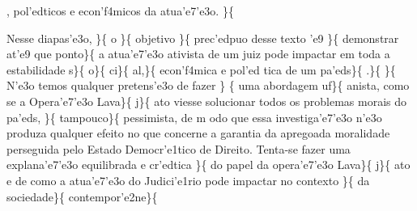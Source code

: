  \ltrch{}
 ,
pol'edticos e econ'f4micos da atua'e7'e3o. \}\{\rtlch{} 
\ltrch{}  \par Nesse diapas'e3o,
\}\{\rtlch{}  \ltrch{}  o \}\{\rtlch{} 
\ltrch{}  objetivo \}\{\rtlch{}
 \ltrch{}  prec'edpuo desse texto 'e9
\}\{\rtlch{}  \ltrch{} 
demonstrar at'e9 que ponto\}\{\rtlch{}  \ltrch{}
 a atua'e7'e3o ativista de um juiz pode
impactar em toda a estabilidade s\}\{\rtlch{}  \ltrch{}
 o\}\{\rtlch{}  \ltrch{}
 ci\}\{\rtlch{}  \ltrch{}
 al,\}\{\rtlch{}  \ltrch{}
 econ'f4mica e pol'ed tica de um
pa'eds\}\{\rtlch{}  \ltrch{} 
.\}\{\rtlch{}  \ltrch{} 
\}\{\rtlch{}  \ltrch{}  N'e3o
temos qualquer pretens'e3o de fazer \} \{\rtlch{}  \ltrch{}
 uma abordagem uf\}\{\rtlch{} 
\ltrch{}  anista, como se a Opera'e7'e3o
Lava\}\{\rtlch{}  \ltrch{}  j\}\{\rtlch{}
 \ltrch{}  ato viesse solucionar
todos os problemas morais do pa'eds, \}\{\rtlch{}  \ltrch{}
 tampouco\}\{\rtlch{}  \ltrch{}
 pessimista, de m odo que essa
investiga'e7'e3o n'e3o produza qualquer efeito no que concerne a
garantia da apregoada moralidade perseguida pelo Estado Democr'e1tico de
Direito. Tenta-se fazer uma explana'e7'e3o equilibrada e cr'edtica
\}\{\rtlch{}  \ltrch{}
 do papel da
opera'e7'e3o Lava\}\{\rtlch{}  \ltrch{}
 j\}\{\rtlch{} 
\ltrch{}
 ato e
de como a atua'e7'e3o do Judici'e1rio pode impactar no contexto
\}\{\rtlch{}  \ltrch{}
 da
sociedade\}\{ \rtlch{}  \ltrch{}
contempor'e2ne\}\{\rtlch{}  \ltrch{}
